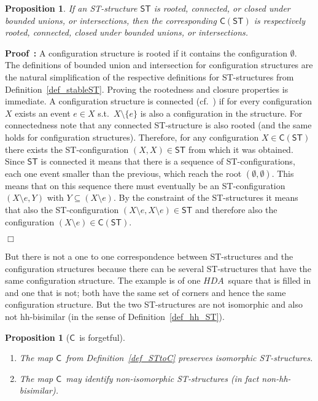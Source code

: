 \documentclass[submission,copyright,creativecommons]{eptcs}
\newtheorem{proposition}[theorem]{Proposition}
\newenvironment{proof}[1][\!\!\,]{\vspace{1ex}\noindent\textbf{Proof #1: }}{\hfill$\Box$\vspace{2ex}}
\newcommand{\cp}[1]{}
\newcommand\HDA{\ensuremath{\mathit{HDA}}}
\newcommand\ST{\ensuremath{\mathsf{ST}}}
\newcommand\stintoc{\ensuremath{\mathsf{C}}}
\begin{document}
\begin{proposition}\label{prop_ST_config_connect}
If an ST-structure $\ST$ is rooted, connected, or closed under bounded unions, or intersections, then the corresponding $\stintoc(\ST)$ is respectively rooted, connected, closed under bounded unions, or intersections.
\end{proposition}

\begin{proof}
A configuration structure is rooted if it contains the configuration $\emptyset$. The definitions of bounded union and intersection for configuration structures are the natural simplification of the respective definitions for ST-structures from Definition~\ref{def_stableST}. Proving the rootedness and closure properties is immediate. 
A configuration structure is connected (cf.\ \cite[Def.5.5]{GlabbeekG01refinement}) if for every configuration $X$ exists an event $e\in X$ s.t.\ $X\setminus\{e\}$ is also a configuration in the structure. For connectedness note that any connected ST-structure is also rooted (and the same holds for configuration structures). Therefore, for any configuration $X\in\stintoc(\ST)$ there exists the ST-configuration $(X,X)\in\ST$ from which it was obtained. Since $\ST$ is connected it means that there is a sequence of ST-configurations, each one event smaller than the previous, which reach the root $(\emptyset,\emptyset)$. This means that on this sequence there must eventually be an ST-configuration $(X\setminus e,Y)$ with $Y\subseteq (X\setminus e)$. By the constraint of the ST-structures it means that also the ST-configuration $(X\setminus e,X\setminus e)\in\ST$ and therefore also the configuration $(X\setminus e)\in\stintoc(\ST)$.
\cp{!!Do this proof with the weaker constraint, so the last line needs redoing.}
\end{proof}



But there is not a one to one correspondence between ST-structures and the configuration structures because there can be several ST-structures that have the same configuration structure. The example is of one \HDA\ square that is filled in and one that is not; both have the same set of corners and hence the same configuration structure. But the two ST-structures are not isomorphic and also not hh-bisimilar (in the sense of Definition~\ref{def_hh_ST}).


\begin{proposition}[\stintoc\ is forgetful]\label{prop_forget_STtoC}
\ 

\begin{enumerate}
\item The map \stintoc\ from Definition~\ref{def_STtoC} preserves isomorphic ST-structures. 

\item The map \stintoc\ may identify non-isomorphic ST-structures (in fact non-hh-bisimilar).
\end{enumerate}
\end{proposition}
\end{document}
